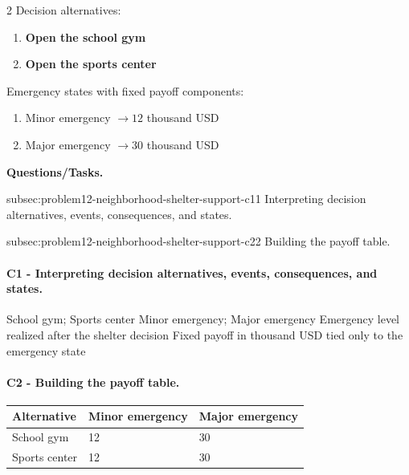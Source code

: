 	\begin{multicols}{2}
		Decision alternatives:
		\begin{enumerate}[label=\arabic*.]
			\item \textbf{Open the school gym}
			\item \textbf{Open the sports center}
		\end{enumerate}

			\columnbreak

		Emergency states with fixed payoff components:
		\begin{enumerate}[label=\arabic*.]
			\item Minor emergency $\to 12$ thousand USD
			\item Major emergency $\to 30$ thousand USD
		\end{enumerate}
	\end{multicols}

	\textbf{Questions/Tasks.}
	\begin{enumerate}
		\CriterionTask
		{subsec:problem12-neighborhood-shelter-support-c1}{1}
		{Interpreting decision alternatives, events, consequences, and states.}

		\CriterionTask
		{subsec:problem12-neighborhood-shelter-support-c2}{2}
		{Building the payoff table.}
	\end{enumerate}

	\paragraph*{C1 - Interpreting decision alternatives, events, consequences, and states.}
	\label{subsec:problem12-neighborhood-shelter-support-c1}
	\DecisionElementsTable
	{School gym; Sports center}
	{Minor emergency; Major emergency}
	{Emergency level realized after the shelter decision}
	{Fixed payoff in thousand USD tied only to the emergency state}


	\paragraph*{C2 - Building the payoff table.}
	\label{subsec:problem12-neighborhood-shelter-support-c2}
	\begin{center}
		\begin{tabular}{lll}
			\toprule
			Alternative & Minor emergency & Major emergency \\
			\midrule
			School gym & 12 & 30 \\
			Sports center & 12 & 30 \\
			\bottomrule
		\end{tabular}
	\end{center}

